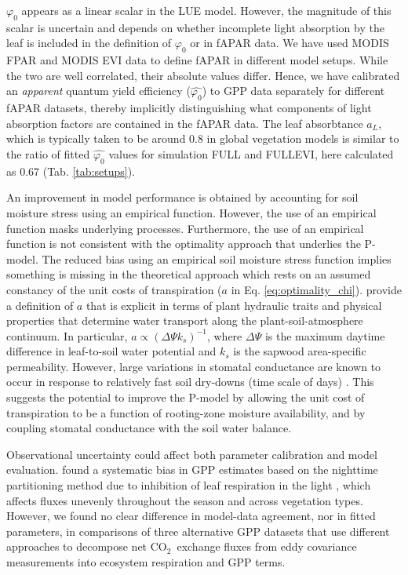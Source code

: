 \documentclass{myreport}
\newcommand{\coo}{CO$_2$}
\begin{document}
$\varphi_0$ appears as a linear scalar in the LUE model. However, the magnitude of this scalar is uncertain and depends on whether incomplete light absorption by the leaf is included in the definition of $\varphi_0$ or in fAPAR data. We have used MODIS FPAR and MODIS EVI data to define fAPAR in different model setups.  While the two are well correlated, their absolute values differ. Hence, we have calibrated an \textit{apparent} quantum yield efficiency ($\widehat{\varphi_0}$) to GPP data separately for different fAPAR datasets, thereby implicitly distinguishing what components of light absorption factors are contained in the fAPAR data. The leaf absorbtance $a_L$, which is typically taken to be around 0.8 in global vegetation models \citep{rogers17} is similar to the ratio of fitted $\widehat{\varphi_0}$ values for simulation FULL and FULL\textunderscore EVI, here calculated as 0.67 (Tab. \ref{tab:setups}).

An improvement in model performance is obtained by accounting for soil moisture stress using an empirical function.  However, the use of an empirical function masks underlying processes. Furthermore, the use of an empirical function is not consistent with the optimality approach that underlies the P-model. The reduced bias using an empirical soil moisture stress function implies something is missing in the theoretical approach which rests on an assumed constancy of the unit costs of transpiration ($a$ in Eq. \ref{eq:optimality_chi}). \citet{prentice14ecollett} provide a definition of $a$ that is explicit in terms of plant hydraulic traits and physical properties that determine water transport along the plant-soil-atmosphere continuum. In particular, $a \propto ( \Delta \Psi k_s )^{-1}$, where $\Delta \Psi$ is the maximum daytime difference in leaf-to-soil water potential and $k_s$ is the sapwood area-specific permeability. However, large variations in stomatal conductance are known to occur in response to relatively fast soil dry-downs (time scale of days) \citep{keenan10agrformet, egea11, stocker18newphyt}. This suggests the potential to improve the P-model by allowing the unit cost of transpiration to be a function of rooting-zone moisture availability, and by coupling stomatal conductance with the soil water balance.

Observational uncertainty could affect both parameter calibration and model evaluation. \citet{keenan19natee} found a systematic bias in GPP estimates based on the nighttime partitioning method due to inhibition of leaf respiration in the light \citep{kok49, wehr16}, which affects fluxes unevenly throughout the season and across vegetation types. However, we found no clear difference in model-data agreement, nor in fitted parameters,  in comparisons of three alternative GPP datasets that use different approaches to decompose net \coo\ exchange fluxes from eddy covariance measurements into ecosystem respiration and GPP terms.
\end{document}
